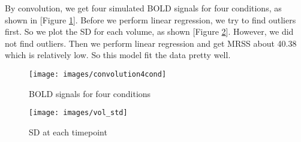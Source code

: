 \par \indent By convolution, we get four simulated BOLD signals for four
conditions, as shown in [Figure \ref{fig:convolution}]. Before we perform linear regression, we try to find outliers first. So we plot the SD for each volume, as shown [Figure \ref{fig:VolumeSD}]. However, we did not find outliers. Then we perform linear regression and get MRSS about 40.38 which is relatively low. So this model fit the data pretty well. 

\begin{figure}[h!]
\centering
\texttt{[image: images/convolution4cond]}
\caption{BOLD signals for four conditions}
\label{fig:convolution}
\end{figure}

\begin{figure}[h!]
\centering
\texttt{[image: images/vol\_std]}               
\caption{SD at each timepoint}
\label{fig:VolumeSD}
\end{figure}
